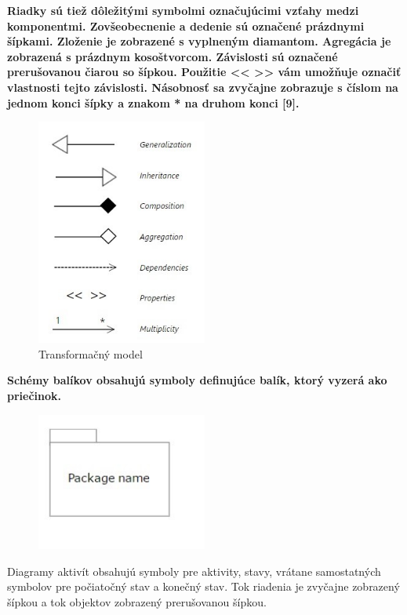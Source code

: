 \documentclass[a4paper]{feidippp}
\begin{document}
\textbf{Riadky sú tiež dôležitými symbolmi označujúcimi vzťahy medzi komponentmi. Zovšeobecnenie a dedenie sú označené prázdnymi šípkami. Zloženie je zobrazené s vyplneným diamantom. Agregácia je zobrazená s prázdnym kosoštvorcom. Závislosti sú označené prerušovanou čiarou so šípkou. Použitie << >> vám umožňuje označiť vlastnosti tejto závislosti. Násobnosť sa zvyčajne zobrazuje s číslom na jednom konci šípky a znakom * na druhom konci [9].}


\begin{figure}[!ht]
\centering 
\includegraphics[width=0.5\textwidth]{dp5.jpg}
\caption{ Transformačný model}\label{o:1}
\end{figure}

\textbf{Schémy balíkov obsahujú symboly definujúce balík, ktorý vyzerá ako priečinok.}

\begin{figure}[!ht]
\centering 
\includegraphics[width=0.5\textwidth]{dp6.jpg}
\end{figure}

Diagramy aktivít obsahujú symboly pre aktivity, stavy, vrátane samostatných symbolov pre počiatočný stav a konečný stav. Tok riadenia je zvyčajne zobrazený šípkou a tok objektov zobrazený prerušovanou šípkou.
\end{document}
